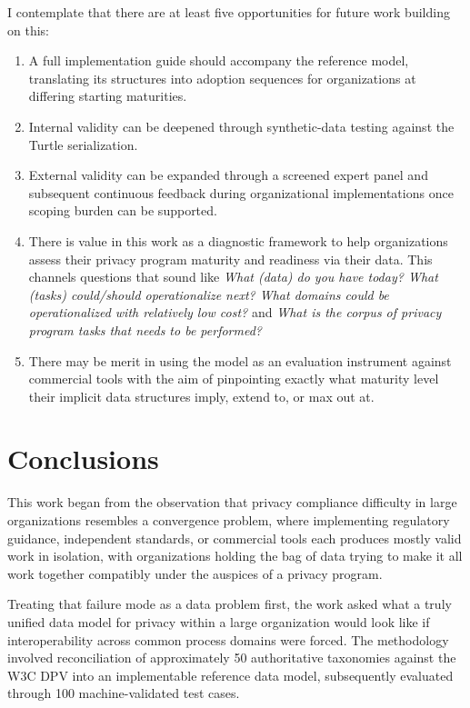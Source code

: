 \documentclass[10pt,letterpaper,twocolumn,twoside]{rho-class/rho}
\begin{document}
I contemplate that there are at least five opportunities for future work building on this: 

\begin{enumerate}
    \item A full implementation guide should accompany the reference model, translating its structures into adoption sequences for organizations at differing starting maturities.
    \item  Internal validity can be deepened through synthetic-data testing against the Turtle serialization. 
    \item External validity can be expanded through a screened expert panel and subsequent continuous feedback during organizational implementations once scoping burden can be supported.
    \item There is value in this work as a diagnostic framework to help organizations assess their privacy program maturity and readiness via their data. This channels questions that sound like \emph{What (data) do you have today? What (tasks) could/should operationalize next? What domains could be operationalized with relatively low cost?} and \emph{What is the corpus of privacy program tasks that needs to be performed?}
    \item There may be merit in using the model as an evaluation instrument against commercial tools with the aim of pinpointing exactly what maturity level their implicit data structures imply, extend to, or max out at.
\end{enumerate}

\section{Conclusions}\label{sec:conclusion}

This work began from the observation that privacy compliance difficulty in large organizations resembles a convergence problem, where implementing regulatory guidance, independent standards, or commercial tools each produces mostly valid work in isolation, with organizations holding the bag of data trying to make it all work together compatibly under the auspices of a privacy program. 

Treating that failure mode as a data problem first, the work asked what a truly unified data model for privacy within a large organization would look like if interoperability across common process domains were forced. The methodology involved reconciliation of approximately 50  authoritative taxonomies against the W3C DPV into an implementable reference data model, subsequently evaluated through 100 machine-validated test cases.
\end{document}

